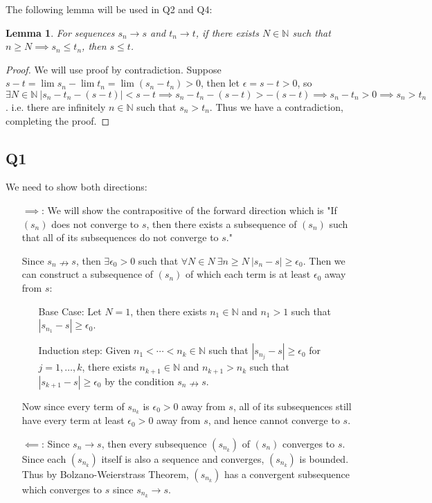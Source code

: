\documentclass[12pt,lettersize]{article}
\newcommand{\N}{\mathbb{N}}
\newtheorem{lem*}{Lemma}
\begin{document}
	The following lemma will be used in Q2 and Q4:
	\begin{lem*}
	For sequences $s_n\rightarrow s$ and $t_n\rightarrow t$, if there exists $N\in\N$ such that $n\geq N\implies s_n\leq t_n$, then $s\leq t$.
	\end{lem*}
	\begin{proof}
	We will use proof by contradiction. Suppose $s-t=\lim s_n-\lim t_n=\lim(s_n-t_n)>0$, then let $\epsilon=s-t>0$, so $\exists N\in\N\ |s_n-t_n-(s-t)|<s-t\implies s_n-t_n-(s-t)>-(s-t)\implies s_n-t_n>0\implies s_n>t_n$. i.e. there are infinitely $n\in\N$ such that $s_n>t_n$. Thus we have a contradiction, completing the proof.
	\end{proof}
	
	\newpage
	
	\subsection*{Q1}
	We need to show both directions:
	\begin{itemize}
		\item[$\implies$:] We will show the contrapositive of the forward direction which is "If $(s_n)$ does not converge to $s$, then there exists a subsequence of $(s_n)$ such that all of its subsequences do not converge to $s$." 
		
		Since $s_n\nrightarrow s$, then $\exists\epsilon_0>0$ such that $\forall N\in N\ \exists n\geq N\ |s_n-s|\geq\epsilon_0$. Then we can construct a subsequence of $(s_n)$ of which each term is at least $\epsilon_0$ away from $s$:
		\begin{itemize}
			\item[Base Case:] Let $N=1$, then there exists $n_1\in\N$ and $n_1>1$ such that $|s_{n_1}-s|\geq\epsilon_0$.
			\item[Induction step:] Given $n_1<\cdots<n_k\in\N$ such that $|s_{n_j}-s|\geq\epsilon_0$ for $j=1,\dots,k$, there exists $n_{k+1}\in\N$ and  $n_{k+1}>n_k$ such that $|s_{k+1}-s|\geq\epsilon_0$ by the condition $s_n\nrightarrow s$.
		\end{itemize}
		Now since every term of $s_{n_k}$ is $\epsilon_0>0$ away from $s$, all of its subsequences still have every term at least $\epsilon_0>0$ away from $s$, and hence cannot converge to $s$.
		\item[$\impliedby$:] Since $s_n\rightarrow s$, then every subsequence $(s_{n_k})$ of $(s_n)$ converges to $s$. Since each $(s_{n_k})$ itself is also a sequence and converges, $(s_{n_k})$ is bounded. Thus by Bolzano-Weierstrass Theorem, $(s_{n_k})$ has a convergent subsequence which converges to $s$ since $s_{n_k}\rightarrow s$.
	\end{itemize}
	\newpage
	
\end{document}
